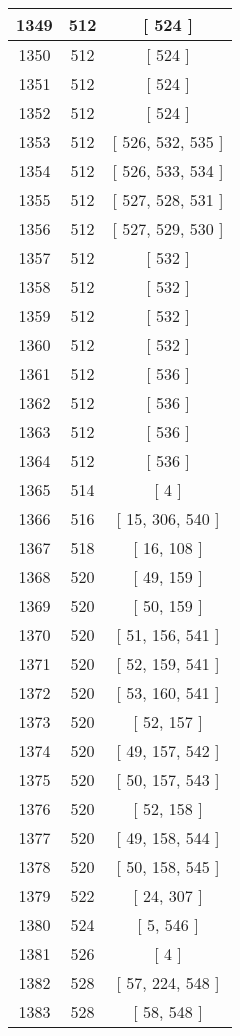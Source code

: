 \begin{center}
\begin{longtable}[H]{|| c c c ||}
\hline
1349 & 512 & [ 524 ] \\ 
\hline
1350 & 512 & [ 524 ] \\ 
\hline
1351 & 512 & [ 524 ] \\ 
\hline
1352 & 512 & [ 524 ] \\ 
\hline
1353 & 512 & [ 526, 532, 535 ] \\ 
\hline
1354 & 512 & [ 526, 533, 534 ] \\ 
\hline
1355 & 512 & [ 527, 528, 531 ] \\ 
\hline
1356 & 512 & [ 527, 529, 530 ] \\ 
\hline
1357 & 512 & [ 532 ] \\ 
\hline
1358 & 512 & [ 532 ] \\ 
\hline
1359 & 512 & [ 532 ] \\ 
\hline
1360 & 512 & [ 532 ] \\ 
\hline
1361 & 512 & [ 536 ] \\ 
\hline
1362 & 512 & [ 536 ] \\ 
\hline
1363 & 512 & [ 536 ] \\ 
\hline
1364 & 512 & [ 536 ] \\ 
\hline
1365 & 514 & [ 4 ] \\ 
\hline
1366 & 516 & [ 15, 306, 540 ] \\ 
\hline
1367 & 518 & [ 16, 108 ] \\ 
\hline
1368 & 520 & [ 49, 159 ] \\ 
\hline
1369 & 520 & [ 50, 159 ] \\ 
\hline
1370 & 520 & [ 51, 156, 541 ] \\ 
\hline
1371 & 520 & [ 52, 159, 541 ] \\ 
\hline
1372 & 520 & [ 53, 160, 541 ] \\ 
\hline
1373 & 520 & [ 52, 157 ] \\ 
\hline
1374 & 520 & [ 49, 157, 542 ] \\ 
\hline
1375 & 520 & [ 50, 157, 543 ] \\ 
\hline
1376 & 520 & [ 52, 158 ] \\ 
\hline
1377 & 520 & [ 49, 158, 544 ] \\ 
\hline
1378 & 520 & [ 50, 158, 545 ] \\ 
\hline
1379 & 522 & [ 24, 307 ] \\ 
\hline
1380 & 524 & [ 5, 546 ] \\ 
\hline
1381 & 526 & [ 4 ] \\ 
\hline
1382 & 528 & [ 57, 224, 548 ] \\ 
\hline
1383 & 528 & [ 58, 548 ] \\ 

\end{longtable}
\end{center}
